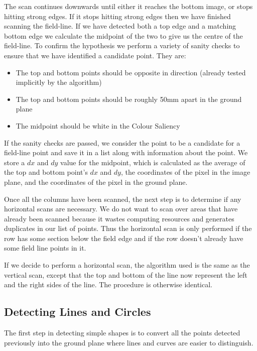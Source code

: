 \documentclass{article}
\begin{document}
The scan continues downwards until either it reaches the bottom image, or stops hitting strong edges. If it stops hitting strong edges then we have finished scanning the field-line. If we have detected both a top edge and a matching bottom edge we calculate the midpoint of the two to give us the centre of the field-line. To confirm the hypothesis we perform a variety of sanity checks to ensure that we have identified a candidate point. They are:

\begin{itemize}
\item The top and bottom points should be opposite in direction (already tested implicitly by the algorithm)
\item	The top and bottom points should be roughly 50mm apart in the ground plane
\item	The midpoint should be white in the Colour Saliency
\end{itemize}

If the sanity checks are passed, we consider the point to be a candidate for a field-line point and save it in a list along with information about the point. We store a $dx$ and $dy$ value for the midpoint, which is calculated as the average of the top and bottom point's $dx$ and $dy$, the coordinates of the pixel in the image plane, and the coordinates of the pixel in the ground plane.

Once all the columns have been scanned, the next step is to determine if any horizontal scans are necessary. We do not want to scan over areas that have already been scanned because it wastes computing resources and generates duplicates in our list of points. Thus the horizontal scan is only performed if the row has some section below the field edge and if the row doesn't already have some field line points in it.

If we decide to perform a horizontal scan, the algorithm used is the same as the vertical scan, except that the top and bottom of the line now represent the left and the right sides of the line. The procedure is otherwise identical. 

\subsection{Detecting Lines and Circles}
The first step in detecting simple shapes is to convert all the points detected previously into the ground plane where lines and curves are easier to distinguish. 
\end{document}
